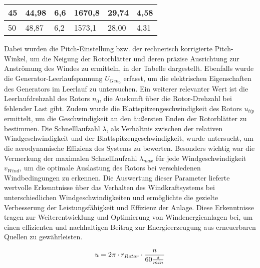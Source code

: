 \begin{table}[H]
\begin{tabular}{|l|l|l|l|l|l|}
    \rowcolor[HTML]{C6E0B4} 
    45                                    & 44,98                                  & 6,6                                                & 1670,8                                   & 29,74                                         & 4,58                                    \\ \hline
    \rowcolor[HTML]{E2EFDA} 
    50                                    & 48,87                                  & 6,2                                                & 1573,1                                   & 28,00                                         & 4,31                                    \\ \hline
    \end{tabular}
    \end{table}

     Dabei wurden die Pitch-Einstellung bzw. der rechnerisch korrigierte Pitch-Winkel, um die Neigung der Rotorblätter und deren 
     präzise Ausrichtung zur Anströmung des Windes zu ermitteln, in der Tabelle dargestellt. Ebenfalls wurde die Generator-Leerlaufspannung $U_{Gen_0}$ erfasst, 
     um die elektrischen Eigenschaften des Generators im Leerlauf zu untersuchen. Ein weiterer relevanter Wert ist die Leerlaufdrehzahl des Rotors $n_0$, 
     die Auskunft über die Rotor-Drehzahl bei fehlender Last gibt. Zudem wurde die Blattspitzengeschwindigkeit des Rotors $u_{tip}$ ermittelt, um die Geschwindigkeit an den äußersten Enden der Rotorblätter zu bestimmen. 
     Die Schnelllaufzahl $\lambda$, als Verhältnis zwischen der relativen Windgeschwindigkeit und der Blattspitzengeschwindigkeit, wurde untersucht, um die aerodynamische Effizienz des Systems zu bewerten. Besonders wichtig war die Vermerkung der maximalen
    Schnelllaufzahl $\lambda_{max}$ für jede Windgeschwindigkeit $v_{Wind}$, um die optimale Auslastung des Rotors bei verschiedenen Windbedingungen zu erkennen. Die Auswertung dieser Parameter lieferte
    wertvolle Erkenntnisse über das Verhalten des Windkraftsystems bei unterschiedlichen Windgeschwindigkeiten und ermöglichte die gezielte Verbesserung der Leistungsfähigkeit und Effizienz der Anlage. Diese Erkenntnisse tragen zur Weiterentwicklung und 
    Optimierung von Windenergieanlagen bei,
     um einen effizienten und nachhaltigen 
     Beitrag zur Energieerzeugung aus erneuerbaren Quellen zu gewährleisten.

\begin{equation}
    \centering
    u = 2 \pi \cdot r_{Rotor} \cdot \frac{n}{60 \frac{s}{min}}
    \label{eq:230615_Umfangsgeschwindigkeit}
\end{equation}

